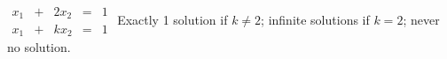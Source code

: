 {$\begin{array}{ccccc}x_1&+&2x_2&=&1\\x_1&+&kx_2&=&1\end{array}$ }
{Exactly 1 solution if $k\neq 2$; infinite solutions if $k=2$; never no solution.}